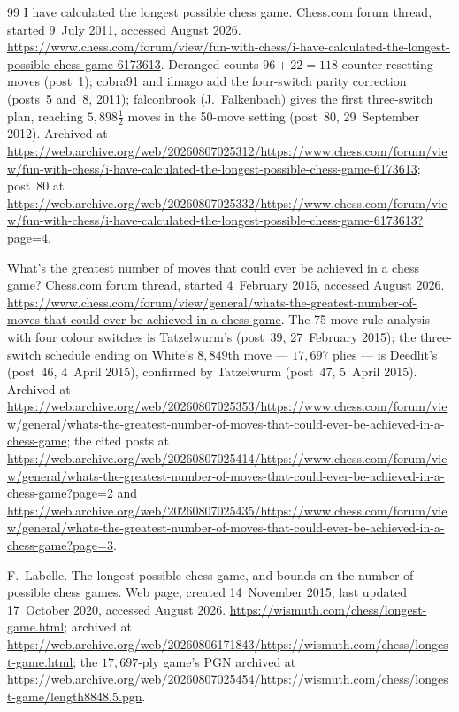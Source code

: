 \documentclass[11pt]{article}
\theoremstyle{definition}
\theoremstyle{remark}
\theoremstyle{plain}
\begin{document}
\begin{thebibliography}{99}
I have calculated the longest possible chess game.
\newblock Chess.com forum thread, started 9~July 2011, accessed August
  2026.
\newblock \url{https://www.chess.com/forum/view/fun-with-chess/i-have-calculated-the-longest-possible-chess-game-6173613}.
\newblock Deranged counts $96 + 22 = 118$ counter-resetting moves
  (post~1); cobra91 and ilmago add the four-switch parity correction
  (posts~5 and~8, 2011); falconbrook (J.~Falkenbach) gives the first
  three-switch plan, reaching $5{,}898\tfrac12$ moves in the 50-move
  setting (post~80, 29~September 2012).
\newblock Archived at
  \url{https://web.archive.org/web/20260807025312/https://www.chess.com/forum/view/fun-with-chess/i-have-calculated-the-longest-possible-chess-game-6173613};
  post~80 at
  \url{https://web.archive.org/web/20260807025332/https://www.chess.com/forum/view/fun-with-chess/i-have-calculated-the-longest-possible-chess-game-6173613?page=4}.

What's the greatest number of moves that could ever be achieved in a
  chess game?
\newblock Chess.com forum thread, started 4~February 2015, accessed
  August 2026.
\newblock \url{https://www.chess.com/forum/view/general/whats-the-greatest-number-of-moves-that-could-ever-be-achieved-in-a-chess-game}.
\newblock The 75-move-rule analysis with four colour switches is
  Tatzelwurm's (post~39, 27~February 2015); the three-switch schedule
  ending on White's $8{,}849$th move --- $17{,}697$ plies --- is
  Deedlit's (post~46, 4~April 2015), confirmed by Tatzelwurm (post~47,
  5~April 2015).
\newblock Archived at
  \url{https://web.archive.org/web/20260807025353/https://www.chess.com/forum/view/general/whats-the-greatest-number-of-moves-that-could-ever-be-achieved-in-a-chess-game};
  the cited posts at
  \url{https://web.archive.org/web/20260807025414/https://www.chess.com/forum/view/general/whats-the-greatest-number-of-moves-that-could-ever-be-achieved-in-a-chess-game?page=2}
  and
  \url{https://web.archive.org/web/20260807025435/https://www.chess.com/forum/view/general/whats-the-greatest-number-of-moves-that-could-ever-be-achieved-in-a-chess-game?page=3}.

F.~Labelle.
\newblock The longest possible chess game, and bounds on the number of
  possible chess games.
\newblock Web page, created 14~November 2015, last updated 17~October
  2020, accessed August 2026.
\newblock \url{https://wismuth.com/chess/longest-game.html}; archived at
  \url{https://web.archive.org/web/20260806171843/https://wismuth.com/chess/longest-game.html};
  the $17{,}697$-ply game's PGN archived at
  \url{https://web.archive.org/web/20260807025454/https://wismuth.com/chess/longest-game/length8848.5.pgn}.


\end{thebibliography}
\end{document}
